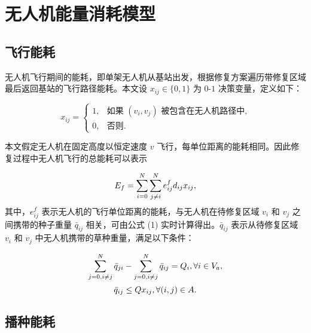 \documentclass[AutoFakeBold]{LZUThesis}
\begin{document}
\section{无人机能量消耗模型}

\subsection{飞行能耗}

无人机飞行期间的能耗，即单架无人机从基站出发，根据修复方案遍历带修复区域最后返回基站的飞行路径能耗。本文设 $x_{ij} \in \{0,1\}$ 为 $0$-$1$ 决策变量，定义如下：

\begin{equation}
	x_{ij} =
	\begin{cases}
		1, & \mbox{如果 $(v_i,v_j)$ 被包含在无人机路径中,} \\
		0, & \mbox{否则}.
	\end{cases}
\end{equation}

本文假定无人机在固定高度以恒定速度 $v$ 飞行，每单位距离的能耗相同。因此修复过程中无人机飞行的总能耗可以表示

\begin{equation} \label{flight-energy}
	\begin{scriptsize}
		E_f =  \sum^N_{i=0}\sum^N_{j \neq i} e^f_{ij} d_{ij} x_{ij},
	\end{scriptsize}
\end{equation}
其中，$e^f_{ij}$ 表示无人机的飞行单位距离的能耗，与无人机在待修复区域 $v_i$ 和 $v_j$ 之间携带的种子重量 $\bar{q}_{ij}$ 相关，可由公式 (1) 实时计算得出。$\bar{q}_{ij}$ 表示从待修复区域 $v_i$ 和 $v_j$ 中无人机携带的草种重量，满足以下条件：

\begin{equation} \label{remained-weight}
	\begin{scriptsize}
		\sum^N_{j=0, i\neq j}\bar{q}_{ji} -  \sum^N_{j=0, i\neq j}\bar{q}_{ij} = Q_i, \forall i \in V_a,
	\end{scriptsize}
\end{equation}
\begin{equation} \label{demanded-weight}
	\begin{small}
		\bar{q}_{ij} \leq Q x_{ij}, \forall (i,j) \in A.
	\end{small}
\end{equation}

\subsection{播种能耗}
\end{document}
